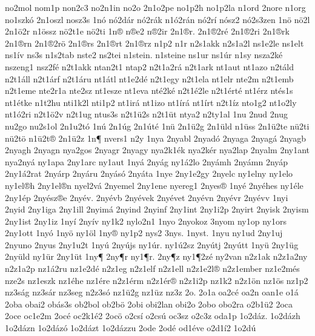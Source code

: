 {no2mol
nom1p
non2c3
no2n1in
no2o
2n1o2pe
no1p2h
no1p2la
n1ord
2nore
n1org
no1szk^^f3
2n1oszl
nosz3s
1n^^f3
n^^f32d^^e1r
n^^f32r^^e1k
n1^^f32r^^e1n
n^^f32r^^ed
n^^f3sz2
n^^f32s3zen
1n^^f6
n^^f62l
2n1^^f62r
n1^^f6ssz
n^^f62t1e
n^^f62ti
1n^^ae
n^^aee2
n^^ae2ir
2n1^^aer.
2n1^^ae2r^^e9
2n1^^ae2ri
2n1^^aerk
2n1^^aern
2n1^^ae2r^^f6
2n1^^aers
2n1^^aert
2n1^^aerz
n1p2
n1r
n2s1akk
n2s1a2l
ns1e2le
ns1elt
ns1^^edv
ns3s
n1s2tab
nste2
ns2tei
n1stein.
n1steine
ns1ur
ns1^^far
n1sy
nsza2k^^e9
nszeng1
nsz2f^^e9
n2t1akk
ntan2t1
ntap2
n2t1a2r^^e1
n2t1ark
nt1aut
nt1azo
n2t^^e1ld
n2t1^^e1ll
n2t1^^e1rf
n2t1^^e1ru
nt1^^e1tl
nt1e2d^^e9
n2t1egy
n2t1ela
nt1elr
nte2m
n2t1emb
n2t1eme
nte2r1a
nte2sz
nt1esze
nt1eva
nt^^e92k^^e9
n2t1^^e92le
n2t1^^e9rt^^e9
nt1^^e9rz
nt^^e9s1s
nt1^^e9tke
n1t2hu
nti1k2l
nti1p2
nt1ir^^e1
nt1izo
nt1^^edr^^e1
nt1^^edrt
n2t1^^edz
nto1g2
nt1o2ly
nt1^^f32ri
n2t1^^f62v
n2t1ug
ntus3s
n2t1^^fc2s
n2t1^^fct
ntya2
n2ty1al
1nu
2nud
2nug
nu2go
nu2s1ol
2n1u2t^^f3
1n^^fa
2n1^^fag
2n1^^fat^^e9
1n^^fc
2n1^^fc2g
2n1^^fcld
n1^^fcss
2n1^^fc2te
n^^fc2ti
n^^fc2t^^f6
n1^^fc2t^^ae
2n1^^fc2z
1n^^b6
nvers1
n2y
1nya
2nyabl
2nyad^^f3
2nyaga
2nyag^^e1
2nyagb
2nyagh
2nyagn
nya2gos
2nyagr
2nyagy
nya2k1^^e9k
nya2k^^e9r
nya2lap
2nyalm
2ny1ant
nya2ny^^e1
ny1apa
2ny1arc
ny1aut
1ny^^e1
2ny^^e1g
ny1^^e12lo
2ny^^e1mh
2ny^^e1mn
2ny^^e1p
2ny1^^e12rat
2ny^^e1rp
2ny^^e1ru
2ny^^e1s^^f3
2ny^^e1ta
1nye
2ny1e2gy
2nyelc
ny1elny
ny1elo
ny1el^^aeh
2ny1el^^aen
nyel2v^^e1
2nyemel
2ny1ene
nyereg1
2nyes^^ae
1ny^^e9
2ny^^e9hes
ny1^^e9le
2ny1^^e9p
2ny^^e9sz^^aee
2ny^^e9v.
2ny^^e9vb
2ny^^e9vek
2ny^^e9vet
2ny^^e9vn
2ny^^e9vr
2ny^^e9vv
1nyi
2nyid
2ny1iga
2ny1ill
2nyim^^e1
2nyind
2nyinf
2ny1int
2ny1i2p
2nyirt
2nyisk
2nyism
2ny1ist
2ny1iz
1ny^^ed
2ny^^edv
ny1k2
nylo2n1
1nyo
2nyokoz
3nyom
ny1op
ny1ors
2ny1ott
1ny^^f3
1ny^^f6
ny1^^f6l
1ny^^ae
ny1p2
nys2
3nys.
1nyst.
1nyu
ny1ud
2ny1uj
2nyuno
2nyus
2ny1u2t
1ny^^fa
2ny^^fajs
ny1^^far.
ny1^^fa2sz
2ny^^fatj
2ny^^fatt
1ny^^fc
2ny1^^fcg
2ny^^fcld
ny1^^fcr
2ny1^^fct
1ny^^b6
2ny^^b6r
ny1^^b6r.
2ny^^b6z
ny1^^b62z^^e9
ny2van
n2z1ak
n2z1a2ny
n2z1a2p
nz1^^e12ru
nz1e2d^^e9
n2z1eg
n2z1elf
n2z1ell
n2z1e2l^^ae
n2z1ember
nz1e2m^^e9s
nze2s
nz1eszk
nz1^^e9he
nz1^^e9re
n2z1^^e9rm
n2z1^^e9r^^ae
n2z1i2p
nz1k2
n2z1^^f6n
nz1^^f6s
nz1p2
nz3s^^e1g
nz3s^^e1r
nz3seg
n2z3s^^f3
nz1^^fc2g
nz1^^fcz
nz3z
2o.
2o1a
oa2c^^e9
oa2n
oan1e
o1^^e1
2oba
obai2
ob^^e1s3s
ob2bol
ob2b^^f6
2obi
obi2lan
obi2o
2obo
obo2ra
o2b1^^fc2
2oca
2oce
oc1e2m
2oc^^e9
oc2k1^^e92
2oc^^f6
o2cs^^ed
o2cs^^fa
oc3sz
o2c3z
oda1p
1o2d^^e1z.
1o2d^^e1zh
1o2d^^e1zn
1o2d^^e1z^^f3
1o2d^^e1zt
1o2d^^e1zzu
2ode
2od^^e9
od1^^e9ve
o2d1^^ed2
1o2d^^fa
}
